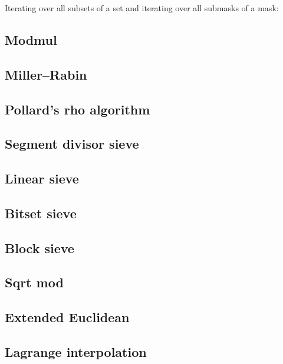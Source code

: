 Iterating over all subsets of a set and iterating over all submasks of a mask:

\subsection{Modmul}

\subsection{Miller–Rabin}

\subsection{Pollard's rho algorithm}

\subsection{Segment divisor sieve}

\subsection{Linear sieve}

\subsection{Bitset sieve}

\subsection{Block sieve}

\subsection{Sqrt mod}

\subsection{Extended Euclidean}

\subsection{Lagrange interpolation}
